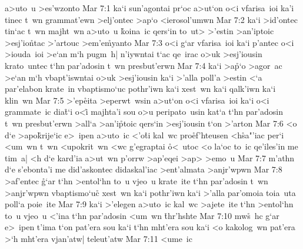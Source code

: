 a>uto~u
>es'wzonto\bibvsend
\vs Mar 7:1
ka`i
sun'agontai
pr`oc
a>ut`on
o<i
vfarisa~ioi
ka'i
tinec
t~wn
grammat'ewn
>elj'ontec
>ap`o
<ierosol'umwn\bibvsend
\vs Mar 7:2
ka`i
>id'ontec
tin`ac
t~wn
majht~wn
a>uto~u
\r{k}oina~ic
qers`in
to~ut>
>'estin
>an'iptoic
>esj'io\r{n}tac
>'artouc
>em'e\r{m}yanto\bibvsend
{}
\vs Mar 7:3
o<i
g`ar
vfarisa~ioi
ka`i
p'antec
o<i
>iouda~ioi
>e`an
m`h
pugm~h|
n'iywntai
t`ac
qe~irac
o>uk
>esj'iousin
krato~untec
t`hn
par'adosin
t~wn
presbut'erwn\bibvsend
\vs Mar 7:4
ka`i
>a\r{p}`o
>agor~ac
>e`an
m`h
vbapt'iswntai
o>uk
>esj'iousin
ka`i
>'alla
poll'a
>estin
<`a
par'elabon
krate~in
vbaptismo`uc
pothr'iwn
ka`i
xest~wn
ka`i
qalk'iwn
ka`i
klin~wn\bibvsend
\vs Mar 7:5
>'ep\r{e}ita
>eperwt~wsin
a>ut`on
o<i
vfarisa~ioi
ka`i
o<i
grammate~ic
dia\r{t}`i
o<i\r{}
majhta'i
sou
o>u
peripato~usin
kat`a
t`hn
par'adosin
t~wn
presbut'erwn
>all`a
>an'i\r{p}toic
qers`in
>esj'iousin
t`on
>'arton\bibvsend
\vs Mar 7:6
<o
d`e
>apo\r{k}rije`ic
e>~ipen
a>uto~ic
<'o\r{t}i
kal~wc
pro\r{e}f'hteusen
<h\r{s}a"'iac
per`i
<um~wn
t~wn
<upokrit~wn
<wc
g'egraptai
\r{o}<~utoc
<o
la`oc
to~ic
qe'iles'in
me
tim~a|
<h
d`e
kard'ia
a>ut~wn
p'orrw
>ap'eqei
>ap>
>emo~u\bibvsend
\vs Mar 7:7
m'athn
d`e
s'ebonta'i
me
did'askontec
didaskal'iac
>ent'almata
>anjr'wpwn\bibvsend
\vs Mar 7:8
>af'entec
\r{g}`ar
t`hn
>entol`hn
to~u
vjeo~u
krate~ite
t`hn
par'adosin
t~wn
>anjr'wpwn
vbaptismo`uc\r{}
xest~wn
ka`i
pothr'iwn
ka`i
>'alla
par'omoia
toia~uta
poll`a
poie~ite\bibvsend
\vs Mar 7:9
ka`i
>'elegen
a>uto~ic
kal~wc
>ajete~ite
t`hn
>entol`hn
to~u
vjeo~u
<'ina
t`hn
par'adosin
<um~wn
\r{t}hr'hshte\bibvsend
{}
\vs Mar 7:10
mw\r{s}~hc
g`ar
e>~ipen
t'ima
t`on
pat'era
sou
ka`i
t`hn
mht'era
sou
ka`i
<o
kakolog~wn
pat'era
>`h
mht'era
vjan'atw|
teleut'atw\bibvsend
\vs Mar 7:11
<ume~ic
